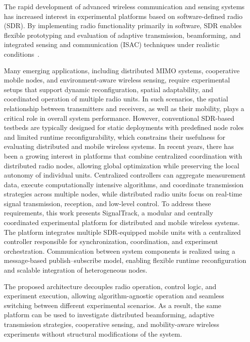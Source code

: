 \documentclass[conference,a4paper]{IEEEtran}
\begin{document}
The rapid development of advanced wireless communication and sensing systems has increased interest in experimental platforms based on software-defined radio (SDR). By implementing radio functionality primarily in software, SDR enables flexible prototyping and evaluation of adaptive transmission, beamforming, and integrated sensing and communication (ISAC) techniques under realistic conditions~\cite{Mitola1993SDR,Ulversoy2010SDR}. 


Many emerging applications, including distributed MIMO systems, cooperative mobile nodes, and environment-aware wireless sensing\cite{Hassanien2016DFRC,Sahin2025PARC}, require experimental setups that support dynamic reconfiguration, spatial adaptability, and coordinated operation of multiple radio units\cite{Goldsmith2003MIMO,Heath2016mmWave,Liu2020ISAC}. In such scenarios, the spatial relationship between transmitters and receivers, as well as their mobility, plays a critical role in overall system performance\cite{AlHourani2014LAP}. However, conventional SDR-based testbeds are typically designed for static deployments with predefined node roles and limited runtime reconfigurability, which constrains their usefulness for evaluating distributed and mobile wireless systems\cite{Ulversoy2010SDR,Tan2015Sora}.
In recent years, there has been a growing interest in platforms that combine centralized coordination with distributed radio nodes, allowing global optimization while preserving the local autonomy of individual units\cite{Hassanien2016DFRC,Liu2020ISAC}. Centralized controllers can aggregate measurement data, execute computationally intensive algorithms, and coordinate transmission strategies across multiple nodes, while distributed radio units focus on real-time signal transmission, reception, and low-level control.
To address these requirements, this work presents SignalTrack, a modular and centrally coordinated experimental platform for distributed and mobile wireless systems. The platform integrates multiple SDR-equipped mobile units with a centralized controller responsible for synchronization, coordination, and experiment orchestration. Communication between system components is realized using a message-based publish–subscribe model, enabling flexible runtime reconfiguration and scalable integration of heterogeneous nodes.

The proposed architecture decouples radio operation, control logic, and experiment execution, allowing algorithm-agnostic operation and seamless switching between different experimental scenarios. As a result, the same platform can be used to investigate distributed beamforming, adaptive transmission strategies, cooperative sensing, and mobility-aware wireless experiments without structural modifications of the system.
\end{document}
